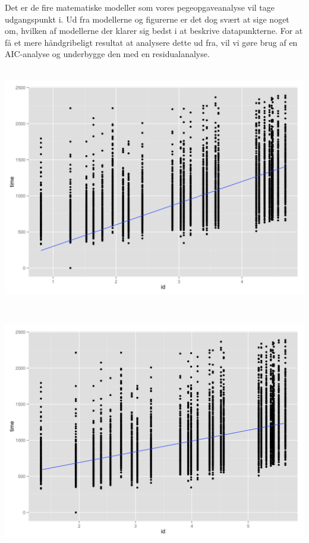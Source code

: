 Det er de fire matematiske modeller som vores pegeopgaveanalyse vil tage udgangspunkt i. Ud fra modellerne og figurerne er det dog svært at sige noget om, hvilken af modellerne der klarer sig bedst i at beskrive datapunkterne. For at få et mere håndgribeligt resultat at analysere dette ud fra, vil vi gøre brug af en AIC-analyse og underbygge den med en residualanalyse.\\\\\begin{minipage}{\linewidth}
	\begin{minipage}[b]{0.45\linewidth}
		\includegraphics[width=\textwidth]{images/plots/plot_model_welford}
		\label{fig:welford_affine_line}
	\end{minipage}
	\begin{minipage}[b]{0.1\linewidth}
	~
	\end{minipage}
	\begin{minipage}[b]{0.45\linewidth}
		\includegraphics[width=\textwidth]{images/plots/plot_model_fitt}

\end{minipage}
\end{minipage}

